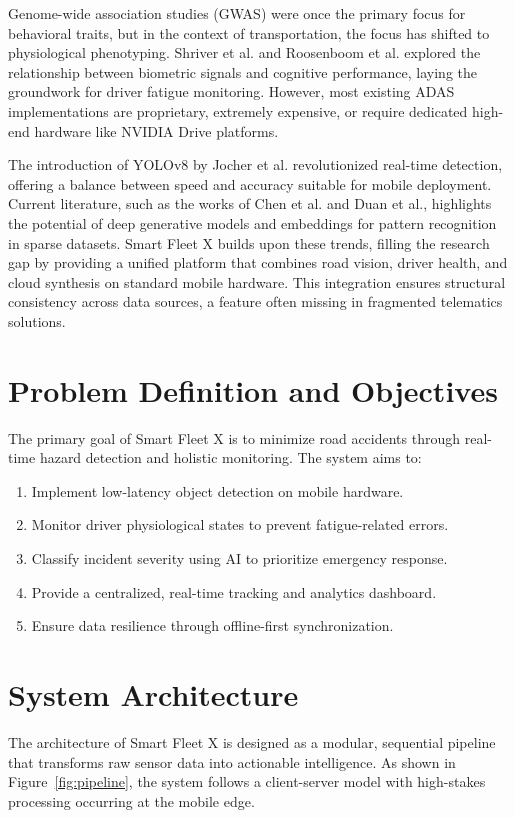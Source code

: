 \documentclass[conference]{IEEEtran}
\begin{document}
Genome-wide association studies (GWAS) were once the primary focus for behavioral traits, but in the context of transportation, the focus has shifted to physiological phenotyping. Shriver et al. and Roosenboom et al. explored the relationship between biometric signals and cognitive performance, laying the groundwork for driver fatigue monitoring. However, most existing ADAS implementations are proprietary, extremely expensive, or require dedicated high-end hardware like NVIDIA Drive platforms.

The introduction of YOLOv8 by Jocher et al. revolutionized real-time detection, offering a balance between speed and accuracy suitable for mobile deployment. Current literature, such as the works of Chen et al. and Duan et al., highlights the potential of deep generative models and embeddings for pattern recognition in sparse datasets. Smart Fleet X builds upon these trends, filling the research gap by providing a unified platform that combines road vision, driver health, and cloud synthesis on standard mobile hardware. This integration ensures structural consistency across data sources, a feature often missing in fragmented telematics solutions.

\section{Problem Definition and Objectives}
The primary goal of Smart Fleet X is to minimize road accidents through real-time hazard detection and holistic monitoring. The system aims to:
\begin{enumerate}
    \item Implement low-latency object detection on mobile hardware.
    \item Monitor driver physiological states to prevent fatigue-related errors.
    \item Classify incident severity using AI to prioritize emergency response.
    \item Provide a centralized, real-time tracking and analytics dashboard.
    \item Ensure data resilience through offline-first synchronization.
\end{enumerate}

\section{System Architecture}
The architecture of Smart Fleet X is designed as a modular, sequential pipeline that transforms raw sensor data into actionable intelligence. As shown in Figure~\ref{fig:pipeline}, the system follows a client-server model with high-stakes processing occurring at the mobile edge.
\end{document}
